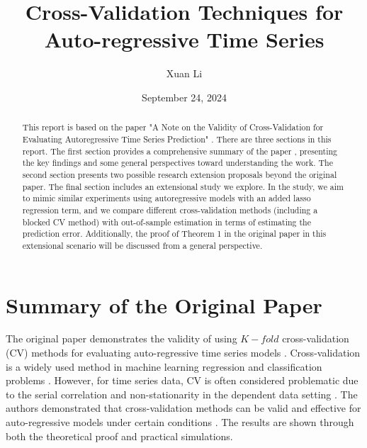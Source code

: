 \documentclass[12pt, oneside]{amsart}
\title{Cross-Validation Techniques for Auto-regressive Time Series}
\author{Xuan Li}
\date{September 24, 2024}
\theoremstyle{definition}
\theoremstyle{remark}
\numberwithin{equation}{section}
\begin{document}
\begin{abstract}
    This report is based on the paper "A Note on the Validity of Cross-Validation for Evaluating Autoregressive Time Series Prediction" \citep{Bergmeir2018}. There are three sections in this report. The first section provides a comprehensive summary of the paper \citep{Bergmeir2018}, presenting the key findings and some general perspectives toward understanding the work. The second section presents two possible research extension proposals beyond the original paper. The final section includes an extensional study we explore. In the study, we aim to mimic similar experiments using autoregressive models with an added lasso regression term, and we compare different cross-validation methods (including a blocked CV method) with out-of-sample estimation in terms of estimating the prediction error. Additionally, the proof of Theorem 1 in the original paper in this extensional scenario will be discussed from a general perspective.
\end{abstract}
\maketitle
\tableofcontents


\section{Summary of the Original Paper}
The original paper demonstrates the validity of using $K-fold$ cross-validation (CV) methods for evaluating auto-regressive time series models \citep{Bergmeir2018}. Cross-validation is a widely used method in machine learning regression and classification problems \citep{Hastie}. However, for time series data, CV is often considered problematic due to the serial correlation and non-stationarity in the dependent data setting \citep{Bergmeir2012}. The authors demonstrated that cross-validation methods can be valid and effective for auto-regressive models under certain conditions \citep{Bergmeir2018}. The results are shown through both the theoretical proof and practical simulations. \\
\end{document}
